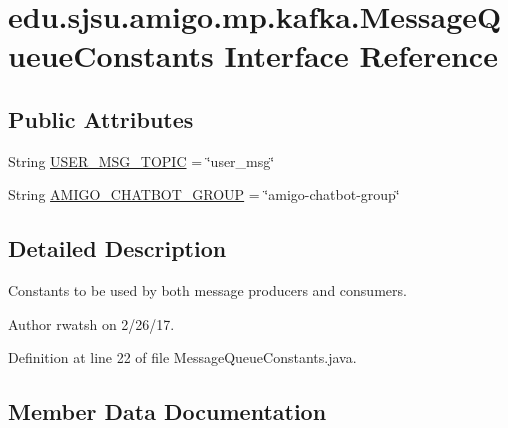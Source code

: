 \hypertarget{interfaceedu_1_1sjsu_1_1amigo_1_1mp_1_1kafka_1_1_message_queue_constants}{}\section{edu.\+sjsu.\+amigo.\+mp.\+kafka.\+Message\+Queue\+Constants Interface Reference}
\label{interfaceedu_1_1sjsu_1_1amigo_1_1mp_1_1kafka_1_1_message_queue_constants}
\subsection*{Public Attributes}
\begin{DoxyCompactItemize}
\item 
String \hyperlink{interfaceedu_1_1sjsu_1_1amigo_1_1mp_1_1kafka_1_1_message_queue_constants_a2ea671fec4966c5b03694061460019c7}{U\+S\+E\+R\+\_\+\+M\+S\+G\+\_\+\+T\+O\+P\+IC} = \char`\"{}user\+\_\+msg\char`\"{}
\item 
String \hyperlink{interfaceedu_1_1sjsu_1_1amigo_1_1mp_1_1kafka_1_1_message_queue_constants_a0aaae96b1ae612160a238421a94dafa7}{A\+M\+I\+G\+O\+\_\+\+C\+H\+A\+T\+B\+O\+T\+\_\+\+G\+R\+O\+UP} = \char`\"{}amigo-\/chatbot-\/group\char`\"{}
\end{DoxyCompactItemize}


\subsection{Detailed Description}
Constants to be used by both message producers and consumers.

\begin{DoxyAuthor}{Author}
rwatsh on 2/26/17. 
\end{DoxyAuthor}


Definition at line 22 of file Message\+Queue\+Constants.\+java.



\subsection{Member Data Documentation}
\mbox{\label{interfaceedu_1_1sjsu_1_1amigo_1_1mp_1_1kafka_1_1_message_queue_constants_a0aaae96b1ae612160a238421a94dafa7}} 
